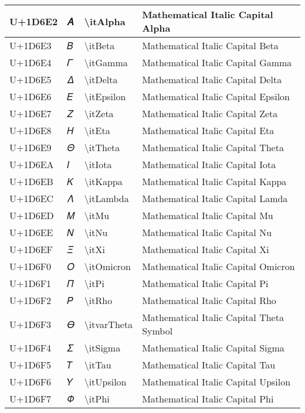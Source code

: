 \begin{table}[h]
\begin{tabulary}{\linewidth}{|L|L|L|L|}
\hline
U+1D6E2 & 𝛢 & {\textbackslash}itAlpha & Mathematical Italic Capital Alpha \\
\hline
U+1D6E3 & 𝛣 & {\textbackslash}itBeta & Mathematical Italic Capital Beta \\
\hline
U+1D6E4 & 𝛤 & {\textbackslash}itGamma & Mathematical Italic Capital Gamma \\
\hline
U+1D6E5 & 𝛥 & {\textbackslash}itDelta & Mathematical Italic Capital Delta \\
\hline
U+1D6E6 & 𝛦 & {\textbackslash}itEpsilon & Mathematical Italic Capital Epsilon \\
\hline
U+1D6E7 & 𝛧 & {\textbackslash}itZeta & Mathematical Italic Capital Zeta \\
\hline
U+1D6E8 & 𝛨 & {\textbackslash}itEta & Mathematical Italic Capital Eta \\
\hline
U+1D6E9 & 𝛩 & {\textbackslash}itTheta & Mathematical Italic Capital Theta \\
\hline
U+1D6EA & 𝛪 & {\textbackslash}itIota & Mathematical Italic Capital Iota \\
\hline
U+1D6EB & 𝛫 & {\textbackslash}itKappa & Mathematical Italic Capital Kappa \\
\hline
U+1D6EC & 𝛬 & {\textbackslash}itLambda & Mathematical Italic Capital Lamda \\
\hline
U+1D6ED & 𝛭 & {\textbackslash}itMu & Mathematical Italic Capital Mu \\
\hline
U+1D6EE & 𝛮 & {\textbackslash}itNu & Mathematical Italic Capital Nu \\
\hline
U+1D6EF & 𝛯 & {\textbackslash}itXi & Mathematical Italic Capital Xi \\
\hline
U+1D6F0 & 𝛰 & {\textbackslash}itOmicron & Mathematical Italic Capital Omicron \\
\hline
U+1D6F1 & 𝛱 & {\textbackslash}itPi & Mathematical Italic Capital Pi \\
\hline
U+1D6F2 & 𝛲 & {\textbackslash}itRho & Mathematical Italic Capital Rho \\
\hline
U+1D6F3 & 𝛳 & {\textbackslash}itvarTheta & Mathematical Italic Capital Theta Symbol \\
\hline
U+1D6F4 & 𝛴 & {\textbackslash}itSigma & Mathematical Italic Capital Sigma \\
\hline
U+1D6F5 & 𝛵 & {\textbackslash}itTau & Mathematical Italic Capital Tau \\
\hline
U+1D6F6 & 𝛶 & {\textbackslash}itUpsilon & Mathematical Italic Capital Upsilon \\
\hline
U+1D6F7 & 𝛷 & {\textbackslash}itPhi & Mathematical Italic Capital Phi \\

\end{tabulary}
\end{table}
